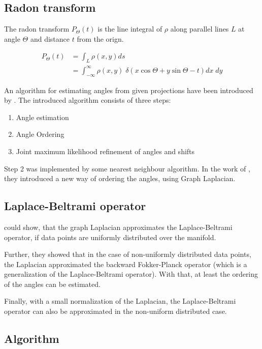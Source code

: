 \subsection{Radon transform}

The radon transform $P_{\Theta}(t)$ is the line integral of $\rho$
along parallel lines $L$ at angle $\Theta$ and distance $t$ from the orign.

\begin{equation}
    \begin{aligned}
        P_{\Theta}(t) &= \int_L \rho (x,y) ds \\
                      &=  \int_{-\infty}^{\infty} \rho (x,y) \; \delta(x \cos \Theta + y \sin \Theta - t) dx \; dy
    \end{aligned}
\end{equation}

An algorithm for estimating angles from given projections have been introduced by \cite{formerUnkownRandomProjections}.
The introduced algorithm consists of three steps:
\begin{enumerate}
    \item Angle estimation
    \item Angle Ordering
    \item Joint maximum likelihood refinement of angles and shifts
\end{enumerate}

Step 2 was implemented by some nearest neighbour algorithm. In the work of 
\cite{LaplaceRandomProjections}, they introduced a new way of ordering the angles,
using Graph Laplacian.


\subsection{Laplace-Beltrami operator}
\cite{LaplaceRandomProjections} could show, that the graph Laplacian
 approximates the Laplace-Beltrami operator, if data points are uniformly distributed 
 over the manifold.

 Further, they showed that in the case of non-uniformly distributed data points, the Laplacian
 approximated the backward Fokker-Planck operator (which is a generalization of the Laplace-Beltrami operator).
 With that, at least the ordering of the angles can be estimated.

 Finally, with a small normalization of the Laplacian, the Laplace-Beltrami operator can also be 
 approximated in the non-uniform distributed case.

\subsection{Algorithm}

